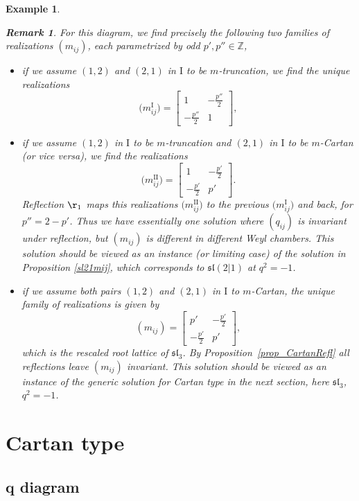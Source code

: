 \documentclass[pdftex]{sigma}%
\numberwithin{equation}{section}
\newtheorem{ese}[teo]{Example}
\newtheorem{oss}[teo]{Remark} }
\newcommand{\Z}{\mathbb{Z}}
\begin{document}
\begin{ese}
\begin{oss}
For this diagram, we find precisely the following two families of realizations $(m_{ij})$, each parametrized by odd $p',p'' \in \Z$,
\begin{itemize}\itemsep=0pt
	\item if we assume $(1,2)$ and $(2,1)$ in $\mathrm{I}$ to be $m$-truncation, we find the unique realizations
	\[
	 \big(m_{ij}^{\mathrm{I}}\big)= \begin{bmatrix}
 1 & -\frac{p''}{2}\\
 -\frac{p''}{2} & 1
\end{bmatrix},\]
	\item if we assume $(1,2)$ in $\mathrm{I}$ to be $m$-truncation and $(2,1)$ in $\mathrm{I}$ to be $m$-Cartan (or vice versa), we find the realizations
 \[
	\big(m_{ij}^{\mathrm{II}}\big)= \begin{bmatrix}
 1 & -\frac{p'}{2}\\
 -\frac{p'}{2} & p'
\end{bmatrix}.
\]
Reflection $\r_1$ maps this realizations $\big(m_{ij}^{\mathrm{II}}\big)$ to the previous $\big(m_{ij}^{\mathrm{I}}\big)$ and back, for $p''=2-p'$. Thus we have essentially one solution where $(q_{ij})$ is invariant under reflection, but $(m_{ij})$ is different in different Weyl chambers.
This solution should be viewed as an instance (or limiting case) of the solution in Proposition \ref{sl21mij}, which corresponds to $\mathfrak{sl}(2|1)$ at $q^2=-1$.
\item if we assume both pairs $(1,2)$ and $(2,1)$ in $\mathrm{I}$ to $m$-Cartan, the unique family of realizations is given by
 \[(m_{ij})= \begin{bmatrix}
 p' & -\frac{p'}{2}\\
 -\frac{p'}{2} & p'
\end{bmatrix}, \]
which is the rescaled root lattice of $\mathfrak{sl}_3$. By Proposition~\ref{prop_CartanRefl} all reflections leave $(m_{ij})$ invariant. This solution should be viewed as an instance of the generic solution for Cartan type in the next section, here $\mathfrak{sl}_3$, $q^2=-1$.
\end{itemize}
\end{oss}
\end{ese}

\section{Cartan type}\label{Cartan}
\subsection[$q$ diagram]{$\boldsymbol{q}$ diagram}\label{Cartanconse}
\end{document}
